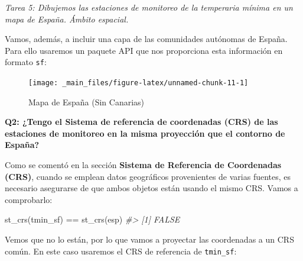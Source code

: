 \documentclass[
]{book}
\newenvironment{Shaded}{\begin{snugshade}}{\end{snugshade}}
\newcommand{\CommentTok}[1]{\textcolor[rgb]{0.56,0.35,0.01}{\textit{#1}}}
\newcommand{\FunctionTok}[1]{\textcolor[rgb]{0.00,0.00,0.00}{#1}}
\newcommand{\NormalTok}[1]{#1}
\newcommand{\OtherTok}[1]{\textcolor[rgb]{0.56,0.35,0.01}{#1}}
\newcommand{\SpecialCharTok}[1]{\textcolor[rgb]{0.00,0.00,0.00}{#1}}
\newcommand{\StringTok}[1]{\textcolor[rgb]{0.31,0.60,0.02}{#1}}
\begin{document}
\emph{Tarea 5: Dibujemos las estaciones de monitoreo de la temperaria mínima en un
mapa de España. Ámbito espacial.}

Vamos, además, a incluir una capa de las comunidades autónomas de España. Para
ello usaremos un paquete API que nos proporciona esta información en formato
\texttt{sf}:

\begin{Shaded}
\end{Shaded}

\begin{figure}

{\centering \texttt{[image: \_main\_files/figure-latex/unnamed-chunk-11-1]} 

}

\caption{Mapa de España (Sin Canarias)}\label{fig:unnamed-chunk-11}
\end{figure}

\textbf{Q2: ¿Tengo el Sistema de referencia de coordenadas (CRS) de las estaciones de
monitoreo en la misma proyección que el contorno de España?}

Como se comentó en la sección \textbf{Sistema de Referencia de Coordenadas (CRS)},
cuando se emplean datos geográficos provenientes de varias fuentes, es necesario
asegurarse de que ambos objetos están usando el mismo CRS. Vamos a comprobarlo:

\begin{Shaded}
\begin{Highlighting}[]
\FunctionTok{st\_crs}\NormalTok{(tmin\_sf) }\SpecialCharTok{==} \FunctionTok{st\_crs}\NormalTok{(esp)}
\CommentTok{\#\textgreater{} [1] FALSE}
\end{Highlighting}
\end{Shaded}

Vemos que no lo están, por lo que vamos a proyectar las coordenadas a un CRS
común. En este caso usaremos el CRS de referencia de \texttt{tmin\_sf}:
\end{document}
